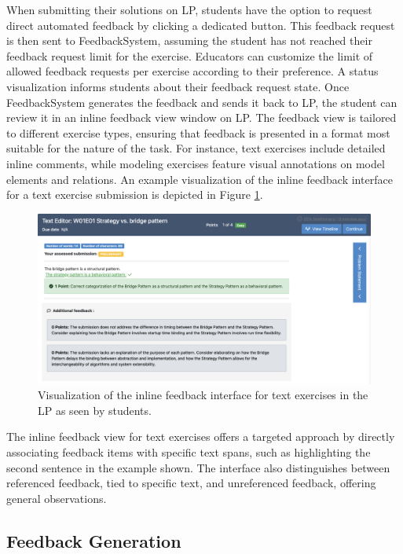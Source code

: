\documentclass[sigconf,screen,review,anonymous]{acmart}
\begin{document}
When submitting their solutions on LP, students have the option to request direct automated feedback by clicking a dedicated button.
This feedback request is then sent to FeedbackSystem, assuming the student has not reached their feedback request limit for the exercise.
Educators can customize the limit of allowed feedback requests per exercise according to their preference.
A status visualization informs students about their feedback request state.
Once FeedbackSystem generates the feedback and sends it back to LP, the student can review it in an inline feedback view window on LP.
The feedback view is tailored to different exercise types, ensuring that feedback is presented in a format most suitable for the nature of the task.
For instance, text exercises include detailed inline comments, while modeling exercises feature visual annotations on model elements and relations.
An example visualization of the inline feedback interface for a text exercise submission is depicted in Figure \ref{fig:Artemis-feedback-visualization}.

\begin{figure}[htbp]
  \centering
  \includegraphics[width=\linewidth]{figures/text-feedback-viewer-cut.png}
  \caption{Visualization of the inline feedback interface for text exercises in the LP as seen by students.}
  \label{fig:Artemis-feedback-visualization}
  \vspace{-4mm}
\end{figure}

The inline feedback view for text exercises offers a targeted approach by directly associating feedback items with specific text spans, such as highlighting the second sentence in the example shown.
The interface also distinguishes between referenced feedback, tied to specific text, and unreferenced feedback, offering general observations.


\subsection{Feedback Generation}
\end{document}
